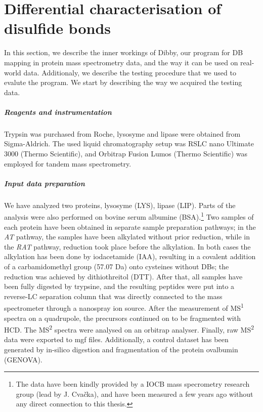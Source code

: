 \chapter{Differential characterisation of disulfide bonds}

In this section, we describe the inner workings of Dibby, our program for DB mapping in protein mass spectrometry data, and the way it can be used on real-world data. Additionaly, we describe the testing procedure that we used to evalute the program. We start by describing the way we acquired the testing data.

\paragraph{Reagents and instrumentation} Trypsin was purchased from Roche, lyso\-syme and lipase were obtained from Sigma-Aldrich. The used liquid chromatography setup was RSLC nano Ultimate 3000 (Thermo Scientific), and Orbitrap Fusion Lumos (Thermo Scientific) was employed for tandem mass spectrometry.

\paragraph{Input data preparation} We have analyzed two proteins, lysosyme (LYS), lipase (LIP). Parts of the analysis were also performed on bovine serum albumine (BSA).\footnote{The data have been kindly provided by a IOCB mass specrometry research group (lead by J. Cvačka), and have been measured a few years ago without any direct connection to this thesis.} Two samples of each protein have been obtained in separate sample preparation pathways; in the \emph{AT} pathway, the samples have been alkylated without prior reduction, while in the \emph{RAT} pathway, reduction took place before the alkylation. In both cases the alkylation has been done by iodacetamide (IAA), resulting in a covalent addition of a carbamidomethyl group (57.07 Da) onto cysteines without DBs; the reduction was achieved by dithiothreitol (DTT). After that, all samples have been fully digested by trypsine, and the resulting peptides were put into a reverse-LC separation column that was directly connected to the mass spectrometer through a nanospray ion source. After the measurement of MS\textsuperscript{1} spectra on a quadrupole, the precursors continued on to be fragmented with HCD\@. The MS\textsuperscript{2} spectra were analysed on an orbitrap analyser. Finally, raw MS\textsuperscript{2} data were exported to mgf files. Additionally, a control dataset has been generated by in-silico digestion and fragmentation of the protein ovalbumin (GENOVA).

